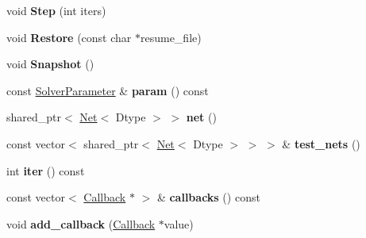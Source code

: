 \begin{DoxyCompactItemize}
\item 
\mbox{\label{classcaffe_1_1_solver_a326b27a6807f57edda47d6d4525a823b}} 
void {\bfseries Step} (int iters)
\item 
\mbox{\label{classcaffe_1_1_solver_ac133985ef686e874f5bd326350d266d8}} 
void {\bfseries Restore} (const char $\ast$resume\+\_\+file)
\item 
\mbox{\label{classcaffe_1_1_solver_a54325448a46b2e5d05b8d3c03522c8f7}} 
void {\bfseries Snapshot} ()
\item 
\mbox{\label{classcaffe_1_1_solver_ae4c3a8528c6f35c0e82316f35799afa0}} 
const \mbox{\hyperlink{classcaffe_1_1_solver_parameter}{Solver\+Parameter}} \& {\bfseries param} () const
\item 
\mbox{\label{classcaffe_1_1_solver_aed1d6d3b5d8c3bf43dd33464af0c9de1}} 
shared\+\_\+ptr$<$ \mbox{\hyperlink{classcaffe_1_1_net}{Net}}$<$ Dtype $>$ $>$ {\bfseries net} ()
\item 
\mbox{\label{classcaffe_1_1_solver_a81216da761d9c24b0b25224d1b77e905}} 
const vector$<$ shared\+\_\+ptr$<$ \mbox{\hyperlink{classcaffe_1_1_net}{Net}}$<$ Dtype $>$ $>$ $>$ \& {\bfseries test\+\_\+nets} ()
\item 
\mbox{\label{classcaffe_1_1_solver_ae8ef547e6e2d8afd3910e75ac0283026}} 
int {\bfseries iter} () const
\item 
\mbox{\label{classcaffe_1_1_solver_a97be40eb471f0cf94b7d21c6942de4dc}} 
const vector$<$ \mbox{\hyperlink{classcaffe_1_1_solver_1_1_callback}{Callback}} $\ast$ $>$ \& {\bfseries callbacks} () const
\item 
\mbox{\label{classcaffe_1_1_solver_a5c712433c94e24bc0aa26179da5fc3d4}} 
void {\bfseries add\+\_\+callback} (\mbox{\hyperlink{classcaffe_1_1_solver_1_1_callback}{Callback}} $\ast$value)
\item 
\mbox{\label{classcaffe_1_1_solver_a657d215c62782e1a0767847e51eaedd5}} 

\end{DoxyCompactItemize}

